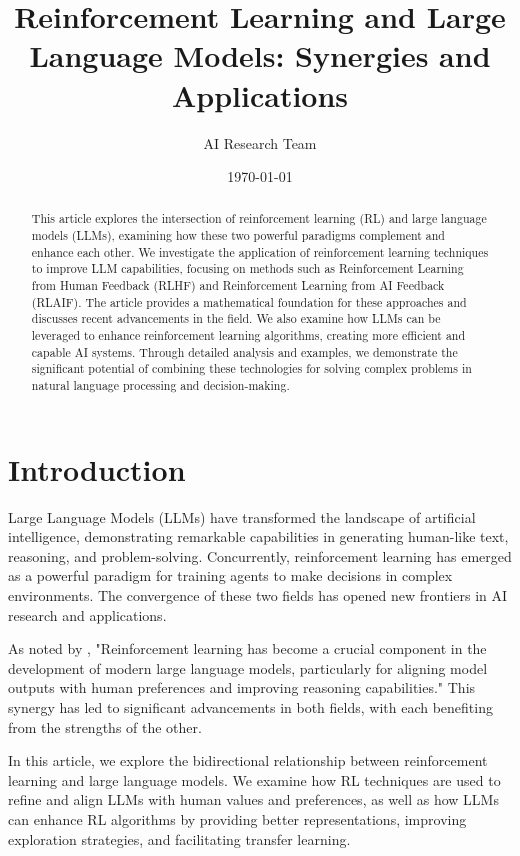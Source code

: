 \documentclass{article}
\title{Reinforcement Learning and Large Language Models: Synergies and Applications}
\author{AI Research Team}
\date{\today}
\begin{document}
\maketitle

\begin{abstract}
This article explores the intersection of reinforcement learning (RL) and large language models (LLMs), examining how these two powerful paradigms complement and enhance each other. We investigate the application of reinforcement learning techniques to improve LLM capabilities, focusing on methods such as Reinforcement Learning from Human Feedback (RLHF) and Reinforcement Learning from AI Feedback (RLAIF). The article provides a mathematical foundation for these approaches and discusses recent advancements in the field. We also examine how LLMs can be leveraged to enhance reinforcement learning algorithms, creating more efficient and capable AI systems. Through detailed analysis and examples, we demonstrate the significant potential of combining these technologies for solving complex problems in natural language processing and decision-making.
\end{abstract}

\section{Introduction}

Large Language Models (LLMs) have transformed the landscape of artificial intelligence, demonstrating remarkable capabilities in generating human-like text, reasoning, and problem-solving. Concurrently, reinforcement learning has emerged as a powerful paradigm for training agents to make decisions in complex environments. The convergence of these two fields has opened new frontiers in AI research and applications.

As noted by \cite{raschka2025}, "Reinforcement learning has become a crucial component in the development of modern large language models, particularly for aligning model outputs with human preferences and improving reasoning capabilities." This synergy has led to significant advancements in both fields, with each benefiting from the strengths of the other.

In this article, we explore the bidirectional relationship between reinforcement learning and large language models. We examine how RL techniques are used to refine and align LLMs with human values and preferences, as well as how LLMs can enhance RL algorithms by providing better representations, improving exploration strategies, and facilitating transfer learning.
\end{document}
